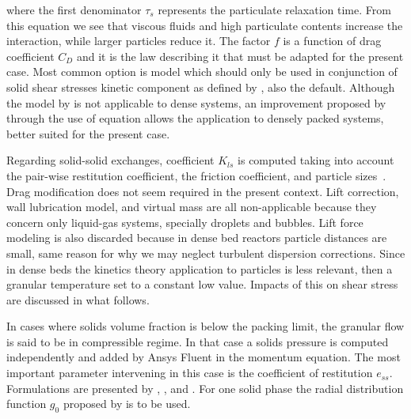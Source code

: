 \noindent{}where the first denominator $\tau_{s}$ represents the particulate relaxation time. From this equation we see that viscous fluids and high particulate contents increase the interaction, while larger particles reduce it. The factor $f$ is a function of drag coefficient $C_{D}$ and it is the law describing it that must be adapted for the present case. Most common option is \textcite{Syamlal1989} model which should only be used in conjunction of solid shear stresses kinetic component as defined by \textcite{Syamlal1993}, also the default. Although the model by \textcite{Wen1966} is not applicable to dense systems, an improvement proposed by \textcite{Gidaspow1992} through the use of \textcite{Ergun1952} equation allows the application to densely packed systems, better suited for the present case.

Regarding solid-solid exchanges, coefficient $K_{ls}$ is computed taking into account the pair-wise restitution coefficient, the friction coefficient, and particle sizes~\cite{Syamlal1987b}. Drag modification does not seem required in the present context. Lift correction, wall lubrication model, and virtual mass are all non-applicable because they concern only liquid-gas systems, specially droplets and bubbles. Lift force modeling is also discarded because in dense bed reactors particle distances are small, same reason for why we may neglect turbulent dispersion corrections. Since in dense beds the kinetics theory application to particles is less relevant, then a granular temperature set to a constant low value. Impacts of this on shear stress are discussed in what follows.

In cases where solids volume fraction is below the packing limit, the granular flow is said to be in compressible regime. In that case a solids pressure is computed independently and added by Ansys Fluent in the momentum equation. The most important parameter intervening in this case is the coefficient of restitution $e_{ss}$. Formulations are presented by \textcite{Lun1984}, \textcite{Syamlal1993}, and \textcite{Ahmadi1990}. For one solid phase the radial distribution function $g_{0}$ proposed by \textcite{Lun1984} is to be used.

